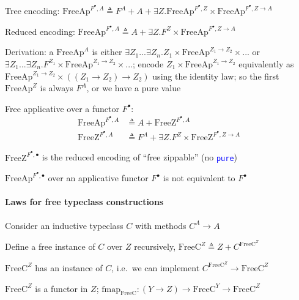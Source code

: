 Tree encoding: {\footnotesize{}$\text{FreeAp}^{F^{\bullet},A}\triangleq F^{A}+A+\exists Z.\text{FreeAp}^{F^{\bullet},Z}\times\text{FreeAp}^{F^{\bullet},Z\rightarrow A}$}{\footnotesize\par}

Reduced encoding:{\footnotesize{} $\text{FreeAp}^{F^{\bullet},A}\triangleq A+\exists Z.F^{Z}\times\text{FreeAp}^{F^{\bullet},Z\rightarrow A}$}{\footnotesize\par}

Derivation: a $\text{FreeAp}^{A}$ is either $\exists Z_{1}...\exists Z_{n}.Z_{1}\times\text{FreeAp}^{Z_{1}\rightarrow Z_{2}}\times...$
or $\exists Z_{1}...\exists Z_{n}.F^{Z_{1}}\times\text{FreeAp}^{Z_{1}\rightarrow Z_{2}}\times...$;
encode $Z_{1}\times\text{FreeAp}^{Z_{1}\rightarrow Z_{2}}$ equivalently
as $\text{FreeAp}^{Z_{1}\rightarrow Z_{2}}\times\left(\left(Z_{1}\rightarrow Z_{2}\right)\rightarrow Z_{2}\right)$
using the identity law; so the first $\text{FreeAp}^{Z}$ is always
$F^{A}$, or we have a pure value 

Free applicative over a functor $F^{\bullet}$: 
\begin{align*}
\text{FreeAp}^{F^{\bullet},A} & \triangleq A+\text{FreeZ}^{F^{\bullet},A}\\
\text{FreeZ}^{F^{\bullet},A} & \triangleq F^{A}+\exists Z.F^{Z}\times\text{FreeZ}^{F^{\bullet},Z\rightarrow A}
\end{align*}

$\text{FreeZ}^{F^{\bullet},\bullet}$ is the reduced encoding of \textsf{``}free
zippable\textsf{''} (no \texttt{\textcolor{blue}{\footnotesize{}pure}})

$\text{FreeAp}^{F^{\bullet},\bullet}$ over an applicative functor
$F^{\bullet}$ is not equivalent to $F^{\bullet}$


\paragraph{Laws for free typeclass constructions}

Consider an inductive typeclass $C$ with methods $C^{A}\rightarrow A$

Define a free instance of $C$ over $Z$ recursively, {\footnotesize{}$\text{FreeC}^{Z}\triangleq Z+C^{\text{FreeC}^{Z}}$}{\footnotesize\par}

$\text{FreeC}^{Z}$ has an instance of $C$, i.e.~we can implement
$C^{\text{FreeC}^{Z}}\rightarrow\text{FreeC}^{Z}$

$\text{FreeC}^{Z}$ is a functor in $Z$; {\footnotesize{}$\text{fmap}_{\text{FreeC}}:\left(Y\rightarrow Z\right)\rightarrow\text{FreeC}^{Y}\rightarrow\text{FreeC}^{Z}$}{\footnotesize\par}

